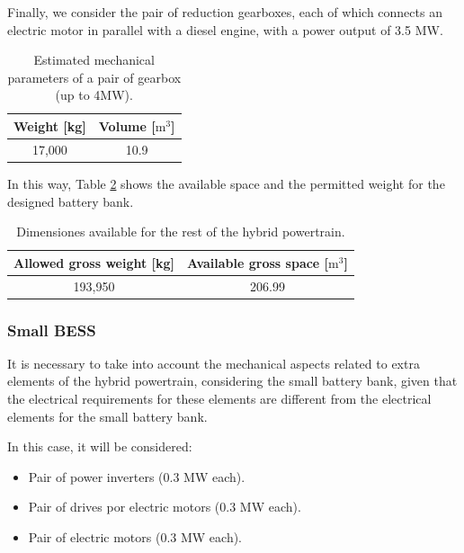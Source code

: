 Finally, we consider the pair of reduction gearboxes, each of which connects an electric motor in parallel with a diesel engine, with a power output of 3.5 MW.

\begin{table}[H]
	\centering
	\caption{Estimated mechanical parameters of a pair of gearbox (up to 4MW)\cite{Reintjes}.}
	\label{tab:VW_gearbox}
	\begin{tabular}{|c|c|}
		\hline
		\rule{0pt}{8pt} \textbf{Weight [kg]} & \textbf{Volume [${\text{m}}^{3}$]} \\
		\hline
		\rule{0pt}{8pt} 17,000 & 10.9 \\
		\hline
	\end{tabular}
\end{table}

In this way, Table \ref{tab:VW_BankBatt} shows the available space and the permitted weight for the designed battery bank.

\begin{table}[H]
	\centering
	\caption{Dimensiones available for the rest of the hybrid powertrain.}
	\label{tab:VW_BankBatt}
	\begin{tabular}{|c|c|}
		\hline
		\rule{0pt}{8pt} \textbf{Allowed gross weight [kg]} & \textbf{Available gross space [${\text{m}}^{3}$]} \\
		\hline
		\rule{0pt}{8pt} 193,950 & 206.99  \\
		\hline
	\end{tabular}
\end{table}

\subsubsection{Small BESS}

It is necessary to take into account the mechanical aspects related to extra elements of the hybrid powertrain, considering the small battery bank, given that the electrical requirements for these elements are different from the electrical elements for the small battery bank.

In this case, it will be considered:

\begin{itemize}
\item Pair of power inverters (0.3 MW each).
\item Pair of drives por electric motors (0.3 MW each).
\item Pair of electric motors (0.3 MW each).
\end{itemize}


